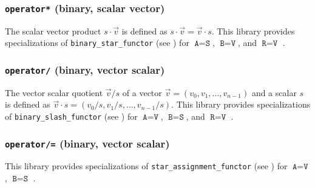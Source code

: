 \subsubsection{\texttt{operator*} (binary, scalar vector)}
The scalar vector product $s \cdot \vec{v}$ is defined as $s \cdot \vec{v} = \vec{v} \cdot s$.
%
This library provides specializations of \texttt{binary\_star\_functor} (see \cite{arithmeticfunctors})
for $\texttt{A}=\texttt{S}$, $\texttt{B}=\texttt{V}$, and $\texttt{R} = \texttt{V}$ \ForAllVectorsAndScalars.

\subsubsection{\texttt{operator/} (binary, vector scalar)}
The vector scalar quotient $\vec{v} / s$ of a vector $\vec{v}=\left(v_0, v_1, \ldots, v_{n-1}\right)$
and a scalar $s$ is defined as $\vec{v} \cdot s = \left(v_0 / s, v_1 / s, \ldots, v_{n-1} /
s\right)$.
%
This library provides specializations of \texttt{binary\_slash\_functor} (see \cite{arithmeticfunctors})
for $\texttt{A}=\texttt{V}$, $\texttt{B}=\texttt{S}$, and $\texttt{R} = \texttt{V}$ \ForAllVectorsAndScalars.

\subsubsection{\texttt{operator/=} (binary, vector scalar)}
This library provides specializations of \texttt{star\_assignment\_functor}  (see \cite{arithmeticfunctors})
for $\texttt{A} = \texttt{V}$, $\texttt{B} = \texttt{S}$ \ForAllVectorsAndScalars.
